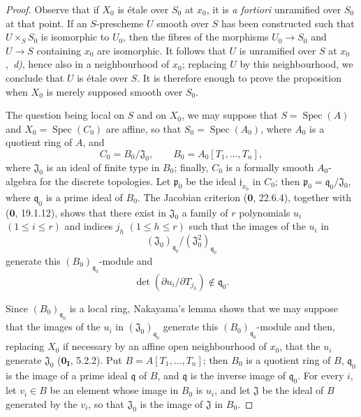 \begin{proof}
Observe that if $X_0$ is \'etale over $S_0$ at $x_0$, it is \emph{a fortiori} unramified over $S_0$ at that point.  If an $S$-prescheme $U$ smooth over $S$ has been constructed such that $U\times_SS_0$ is isomorphic to $U_0$, then the fibres of the morphisms $U_0\to S_0$ and $U\to S$ containing $x_0$ are isomorphic.  It follows that $U$ is unramified over $S$ at $x_0$ ,~\emph{d)}, hence also in a neighbourhood of $x_0$; replacing $U$ by this neighbourhood, we conclude that $U$ is \'etale over $S$.  It is therefore enough to prove the proposition when $X_0$ is merely supposed smooth over $S_0$.

The question being local on $S$ and on $X_0$, we may suppose that $S=\operatorname{Spec}(A)$ and $X_0=\operatorname{Spec}(C_0)$ are affine, so that $S_0=\operatorname{Spec}(A_0)$, where $A_0$ is a quotient ring of $A$, and
\[
 C_0=B_0/\mathfrak{J}_0,\qquad B_0=A_0[T_1,\ldots,T_n],
\]
where $\mathfrak{J}_0$ is an ideal of finite type in $B_0$; finally, $C_0$ is a formally smooth $A_0$-algebra for the discrete topologies.  Let $\mathfrak p_0$ be the ideal $\mathfrak j_{x_0}$ in $C_0$; then $\mathfrak p_0=\mathfrak q_0/\mathfrak{J}_0$, where $\mathfrak q_0$ is a prime ideal of $B_0$.  The Jacobian criterion ($\mathbf{0}$, 22.6.4), together with ($\mathbf{0}$, 19.1.12), shows that there exist in $\mathfrak{J}_0$ a family of $r$ polynomials $u_i$ $(1\leq i\leq r)$ and indices $j_h$ $(1\leq h\leq r)$ such that the images of the $u_i$ in
\[
 (\mathfrak{J}_0)_{\mathfrak q_0}/(\mathfrak{J}_0^2)_{\mathfrak q_0}
\]
generate this $(B_0)_{\mathfrak q_0}$-module and
\begin{equation}
 \det(\partial u_i/\partial T_{j_h})\notin\mathfrak q_0.
 \tag{18.1.1.1}\label{IV.18.1.1.1}
\end{equation}

Since $(B_0)_{\mathfrak q_0}$ is a local ring, Nakayama's lemma shows that we may suppose that the images of the $u_i$ in $(\mathfrak{J}_0)_{\mathfrak q_0}$ generate this $(B_0)_{\mathfrak q_0}$-module and then, replacing $X_0$ if necessary by an affine open neighbourhood of $x_0$, that the $u_i$ generate $\mathfrak{J}_0$ ($\mathbf{0}_{\mathbf I}$, 5.2.2).  Put $B=A[T_1,\ldots,T_n]$; then $B_0$ is a quotient ring
of $B$, $\mathfrak q_0$ is the image of a prime ideal $\mathfrak q$ of $B$, and $\mathfrak q$ is the inverse image of $\mathfrak q_0$.  For every $i$, let $v_i\in B$ be an element whose image in $B_0$ is $u_i$, and let $\mathfrak{J}$ be the ideal of $B$ generated by the $v_i$, so that $\mathfrak{J}_0$ is the image of $\mathfrak{J}$ in $B_0$.


\end{proof}
